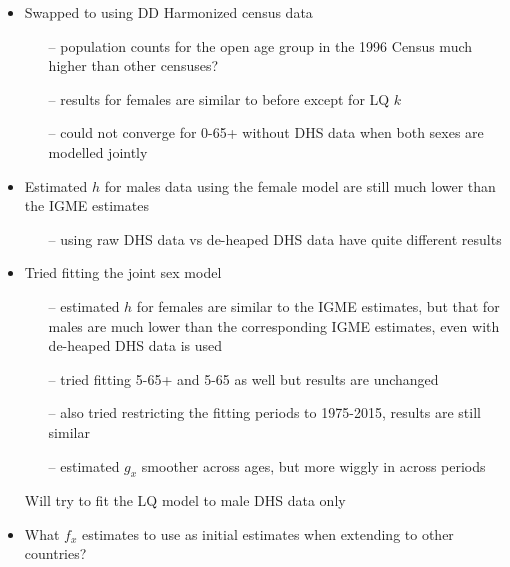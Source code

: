 \documentclass[12pt,a4paper]{article}
\date{\vspace{-5ex}}
\begin{document}
\begin{itemize}
\item Swapped to using DD Harmonized census data
\begin{itemize}
\item[--] population counts for the open age group in the 1996 Census much higher than other censuses?
\item[--] results for females are similar to before except for LQ $k$
\item[--] could not converge for 0-65+ without DHS data when both sexes are modelled jointly
\end{itemize}
\item Estimated $h$ for males data using the female model are still much lower than the IGME estimates
\begin{itemize}
\item[--] using raw DHS data vs de-heaped DHS data have quite different results
\end{itemize}
\item Tried fitting the joint sex model
\begin{itemize}
\item[--] estimated $h$ for females are similar to the IGME estimates, but that for males are much lower than the corresponding IGME estimates, even with de-heaped DHS data is used
\item[--] tried fitting 5-65+ and 5-65 as well but results are unchanged
\item[--] also tried restricting the fitting periods to 1975-2015, results are still similar
\item[--] estimated $g_x$ smoother across ages, but more wiggly in across periods
\end{itemize}
\itme Will try to fit the LQ model to male DHS data only
\item What $f_x$ estimates to use as initial estimates when extending to other countries?
\end{itemize}

\newpage
\end{document}
